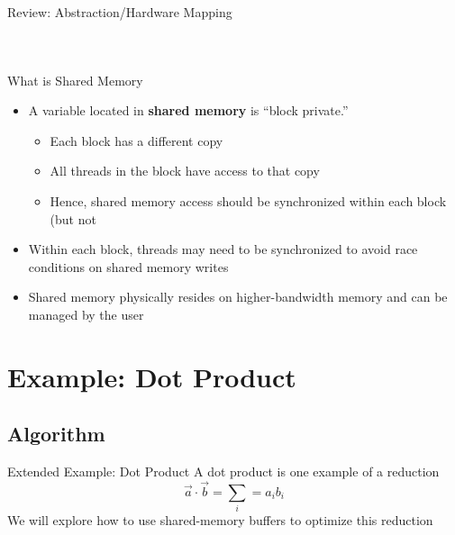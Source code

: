 \documentclass{beamer}
\begin{document}
\begin{frame}{Review: Abstraction/Hardware Mapping}
\begin{columns}
\begin{figure}
            \end{figure}
        \end{columns}
    \end{frame}

    \begin{frame}{What is Shared Memory}
        \begin{itemize}
            \item A variable located in \textbf{shared memory} is ``block private.''
            \begin{itemize}
                \item Each block has a different copy
                \item All threads in the block have access to that copy
                \item Hence, shared memory access should be synchronized within each block (but not
            \end{itemize}
            \item Within each block, threads may need to be synchronized to avoid race conditions on shared memory writes
            \item Shared memory physically resides on higher-bandwidth memory and can be managed by the user
        \end{itemize}
    \end{frame}
    
    \section{Example: Dot Product}
    
    \subsection{Algorithm}

    \begin{frame}{Extended Example: Dot Product}
        A dot product is one example of a reduction
        \begin{equation*}
            \vec{a} \cdot \vec{b} = \sum_i = a_i b_i
        \end{equation*}
        We will explore how to use shared-memory buffers to optimize this reduction
    \end{frame}
\end{document}
